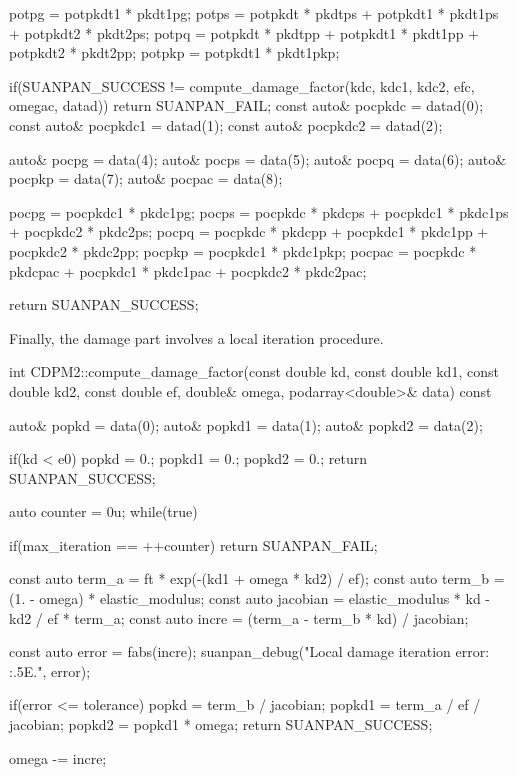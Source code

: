 \begin{cppcode}
{    potpg = potpkdt1 * pkdt1pg;
    potps = potpkdt * pkdtps + potpkdt1 * pkdt1ps + potpkdt2 * pkdt2ps;
    potpq = potpkdt * pkdtpp + potpkdt1 * pkdt1pp + potpkdt2 * pkdt2pp;
    potpkp = potpkdt1 * pkdt1pkp;

    if(SUANPAN_SUCCESS != compute_damage_factor(kdc, kdc1, kdc2, efc, omegac, datad)) return SUANPAN_FAIL;
    const auto& pocpkdc = datad(0);
    const auto& pocpkdc1 = datad(1);
    const auto& pocpkdc2 = datad(2);

    auto& pocpg = data(4);
    auto& pocps = data(5);
    auto& pocpq = data(6);
    auto& pocpkp = data(7);
    auto& pocpac = data(8);

    pocpg = pocpkdc1 * pkdc1pg;
    pocps = pocpkdc * pkdcps + pocpkdc1 * pkdc1ps + pocpkdc2 * pkdc2ps;
    pocpq = pocpkdc * pkdcpp + pocpkdc1 * pkdc1pp + pocpkdc2 * pkdc2pp;
    pocpkp = pocpkdc1 * pkdc1pkp;
    pocpac = pocpkdc * pkdcpac + pocpkdc1 * pkdc1pac + pocpkdc2 * pkdc2pac;

    return SUANPAN_SUCCESS;
}
\end{cppcode}

Finally, the damage part involves a local iteration procedure.
\begin{cppcode}
int CDPM2::compute_damage_factor(const double kd, const double kd1, const double kd2, const double ef, double& omega, podarray<double>& data) const {
    auto& popkd = data(0);
    auto& popkd1 = data(1);
    auto& popkd2 = data(2);

    if(kd < e0) {
        popkd = 0.;
        popkd1 = 0.;
        popkd2 = 0.;
        return SUANPAN_SUCCESS;
    }

    auto counter = 0u;
    while(true) {
        if(max_iteration == ++counter) return SUANPAN_FAIL;

        const auto term_a = ft * exp(-(kd1 + omega * kd2) / ef);
        const auto term_b = (1. - omega) * elastic_modulus;
        const auto jacobian = elastic_modulus * kd - kd2 / ef * term_a;
        const auto incre = (term_a - term_b * kd) / jacobian;

        const auto error = fabs(incre);
        suanpan_debug("Local damage iteration error: {:.5E}.\n", error);

        if(error <= tolerance) {
            popkd = term_b / jacobian;
            popkd1 = term_a / ef / jacobian;
            popkd2 = popkd1 * omega;
            return SUANPAN_SUCCESS;
        }

        omega -= incre;
    }
}
\end{cppcode}
